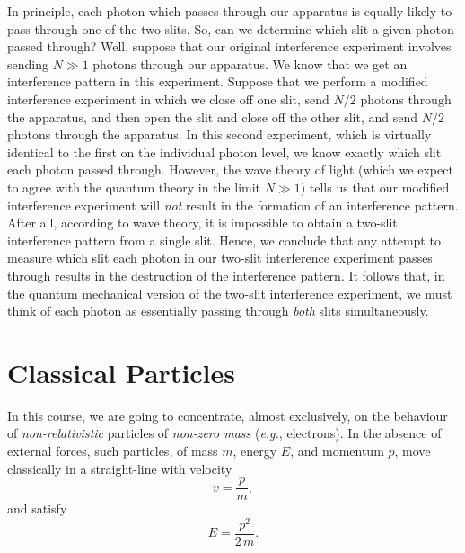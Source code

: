 In principle, each photon which passes through our apparatus is equally
likely to pass through one of the two slits. So, can we determine
which slit a given photon passed through? Well, suppose that our
original interference experiment involves sending $N\gg 1$ photons
through our apparatus. We know that we get an
interference pattern in this experiment. Suppose that we perform a modified interference
experiment in which we close off one slit, send $N/2$ photons
through the apparatus, and then open the slit and close off
the other slit, and send $N/2$ photons through the apparatus. In this
second
experiment, which is virtually identical to the first on the individual photon
level,
we know exactly which slit each photon passed through. 
However, the wave theory of light (which we expect to agree
with the quantum theory in the limit $N\gg 1$) tells us that our
modified interference experiment will {\em not}\/ result in the formation of an interference pattern. After all, according to wave theory, it is impossible to obtain a two-slit interference
pattern from a single slit. Hence, we conclude that any attempt to measure
which slit each photon in our two-slit interference experiment
passes through results in the destruction of the interference pattern. It follows
that, in the quantum mechanical version of the two-slit interference experiment, we must think of each photon
as essentially passing through {\em both}\/ slits simultaneously.

\section{Classical Particles}
In this course, we are going to concentrate, almost exclusively, on the
behaviour of {\em non-relativistic}\/ particles of {\em non-zero mass}\/ ({\em e.g.}, electrons). In the
absence of external forces, such particles, of mass $m$, energy $E$, and
momentum $p$, move classically in a straight-line with velocity
\begin{equation}\label{e2.31}
v = \frac{p}{m},
\end{equation}
and satisfy
\begin{equation}\label{e2.32}
E = \frac{p^2}{2\,m}.
\end{equation}

